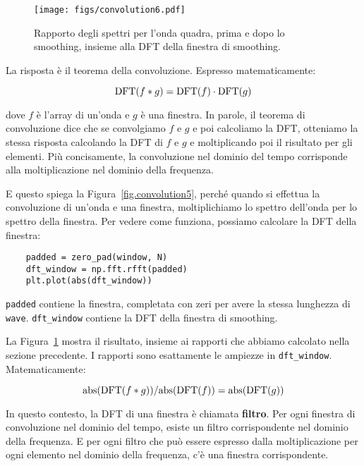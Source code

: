 \documentclass[12pt]{book} \usepackage[width=5.5in,height=8.5in, hmarginratio=3:2,vmarginratio=1:1]{geometry}
\begin{document}
\begin{figure} 

\centerline{\texttt{[image: figs/convolution6.pdf]}} \caption{Rapporto degli spettri per l'onda quadra, prima e dopo lo smoothing, insieme alla DFT della finestra di smoothing.} \label{fig.convolution6} \end{figure} 

\newcommand{\DFT}{\mathrm{DFT}} \newcommand{\IDFT}{\mathrm{IDFT}}

La risposta è il teorema della convoluzione. Espresso matematicamente:

%
\[ \DFT(f \conv g) = \DFT(f) \cdot \DFT(g) \] 

%
dove $f$ è l'array di un'onda e $g$ è una finestra. In parole, il teorema di convoluzione dice che se convolgiamo $f$ e $g$ e poi calcoliamo la DFT, otteniamo la stessa risposta calcolando la DFT di $f$ e $g$ e moltiplicando poi il risultato per gli elementi. Più concisamente, la convoluzione nel dominio del tempo corrisponde alla moltiplicazione nel dominio della frequenza.

E questo spiega la Figura~\ref{fig.convolution5}, perché quando si effettua la convoluzione di un'onda e una finestra, moltiplichiamo lo spettro dell'onda per lo spettro della finestra. Per vedere come funziona, possiamo calcolare la DFT della finestra:

\begin{verbatim} 
    padded = zero_pad(window, N)
    dft_window = np.fft.rfft(padded)
    plt.plot(abs(dft_window))
 \end{verbatim} 

{\tt padded} contiene la finestra, completata con zeri per avere la stessa lunghezza di {\tt wave}. \verb"dft_window" contiene la DFT della finestra di smoothing.

\newcommand{\abs}{\mathrm{abs}}

La Figura~\ref{fig.convolution6} mostra il risultato, insieme ai rapporti che abbiamo calcolato nella sezione precedente. I rapporti sono esattamente le ampiezze in \verb"dft_window". Matematicamente:

%
\[ \abs(\DFT(f \conv g)) / \abs(\DFT(f)) = \abs(\DFT(g)) \] 

%
In questo contesto, la DFT di una finestra è chiamata {\bf filtro}. Per ogni finestra di convoluzione nel dominio del tempo, esiste un filtro corrispondente nel dominio della frequenza. E per ogni filtro che può essere espresso dalla moltiplicazione per ogni elemento nel dominio della frequenza, c'è una finestra corrispondente.
\end{document}
